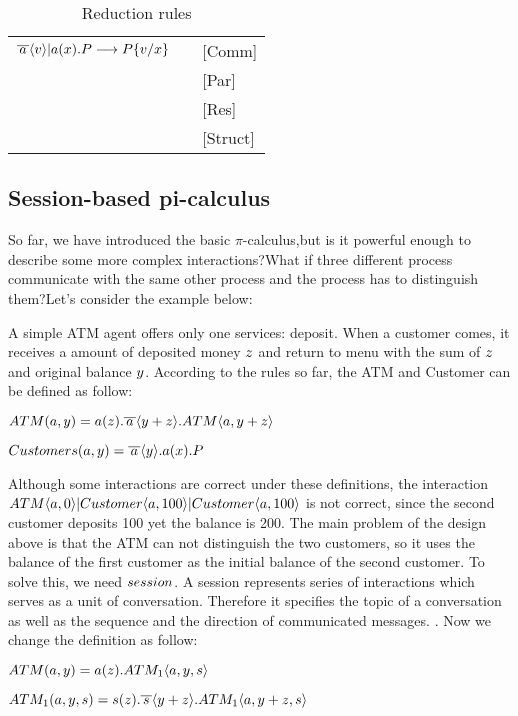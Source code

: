 \documentclass[a4paper]{article}
\newcommand{\sendv}[2]{\bar{#1}\langle \ensuremath #2 \rangle}
\newcommand{\recx}[2]{\ensuremath #1(#2)}
\begin{document}
\begin{table}
\centering
\begin{tabular}{lll}
$\sendv{a}{v} | \recx{a}{x}.\PP \redsym \PP \sub{v}{x}$&&[Comm]\\
&&[Par]\\
&&[Res]\\
&&[Struct]\\
\end{tabular}
\caption{Reduction rules}
\end{table}

\subsection{Session-based pi-calculus}
So far, we have introduced the basic \(\pi\)-calculus,but is it powerful enough to describe some more complex interactions?What if three different process communicate with the same other process and the process has to distinguish them?Let's consider the example below:

A simple ATM agent offers only one services: deposit. When a customer comes, it receives a amount of deposited money $z$ and return to menu with the sum of $z$ and original balance $y$. According to the rules so far, the ATM and Customer can be  defined as follow:

$\ensuremath ATM(a,y) = \recx{a}{z}.\sendv{a}{y+z}.ATM\langle a,y+z \rangle$ 

$\ensuremath Customers(a,y) = \sendv{a}{y}.\recx{a}{x}.\PP$

Although some interactions are correct under these definitions, the interaction $\ensuremath ATM\langle a,0 \rangle | Customer\langle a,100 \rangle | Customer\langle a,100 \rangle$ is not correct, since the second customer deposits 100 yet the balance is 200. The main problem of the design above is that the ATM can not distinguish the two customers, so it uses the balance of the first customer as the initial balance of the second customer. To solve this, we need $\ensuremath session$. A session represents series of interactions which serves as a unit of conversation. Therefore it specifies the topic of a conversation as well as the sequence and the direction of communicated messages. . Now we change the definition as follow:

$\ensuremath ATM(a,y) = \recx{a}{z}.ATM_{1}\langle a,y,s \rangle$ 

$\ensuremath ATM_{1}(a,y,s) = \recx{s}{z}.\sendv{s}{y+z}.ATM_{1}\langle a,y+z,s \rangle$ 
\end{document}
